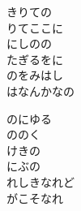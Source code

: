 \documentclass[10pt,b5j]{tarticle} %
\begin{document}
\begin{enumerate}
\begin{minipage}[c]{\blocksize}
        \vspace{\linespace}
        \item
        きりての\\
        りてここに\\
        にしのの\\
        たぎるをに\\
        のをみはし\\
        はなんかなの
        
        \vspace{\linespace}
        \item
        のにゆる\\
        ののく\\
        けきの\\
        にぶの\\
        れしきなれど\\
        がこそなれ
    
    \end{minipage}
\end{enumerate} %
\end{document}
